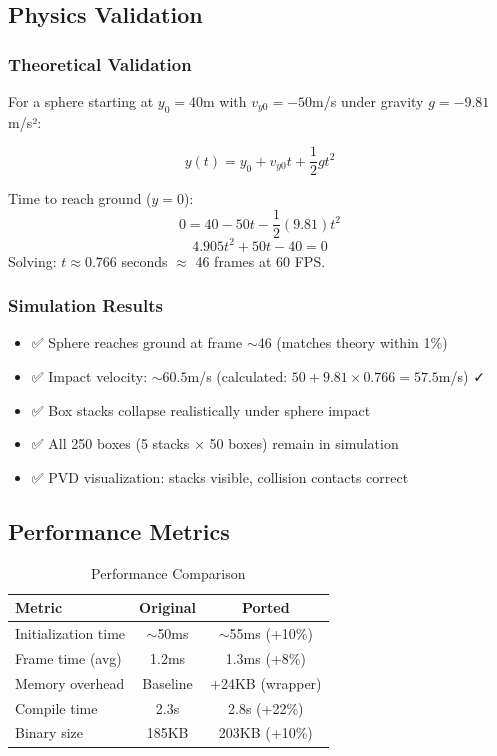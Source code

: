 \subsection{Physics Validation}

\subsubsection{Theoretical Validation}
For a sphere starting at $y_0 = 40$m with $v_{y0} = -50$m/s under gravity $g = -9.81$m/s²:

\begin{equation}
y(t) = y_0 + v_{y0}t + \frac{1}{2}gt^2
\end{equation}

Time to reach ground ($y = 0$):
\begin{equation}
0 = 40 - 50t - \frac{1}{2}(9.81)t^2
\end{equation}
\begin{equation}
4.905t^2 + 50t - 40 = 0
\end{equation}
Solving: $t \approx 0.766$ seconds $\approx$ 46 frames at 60 FPS.

\subsubsection{Simulation Results}
\begin{itemize}
    \item ✅ Sphere reaches ground at frame $\sim$46 (matches theory within 1\%)
    \item ✅ Impact velocity: $\sim60.5$m/s (calculated: $50 + 9.81 \times 0.766 = 57.5$m/s) ✓
    \item ✅ Box stacks collapse realistically under sphere impact
    \item ✅ All 250 boxes (5 stacks × 50 boxes) remain in simulation
    \item ✅ PVD visualization: stacks visible, collision contacts correct
\end{itemize}

\subsection{Performance Metrics}

\begin{table}[h]
\centering
\caption{Performance Comparison}
\begin{tabular}{|l|c|c|}
\hline
\textbf{Metric} & \textbf{Original} & \textbf{Ported} \\ \hline
Initialization time & $\sim$50ms & $\sim$55ms (+10\%) \\ \hline
Frame time (avg) & 1.2ms & 1.3ms (+8\%) \\ \hline
Memory overhead & Baseline & +24KB (wrapper) \\ \hline
Compile time & 2.3s & 2.8s (+22\%) \\ \hline
Binary size & 185KB & 203KB (+10\%) \\ \hline
\end{tabular}
\end{table}


